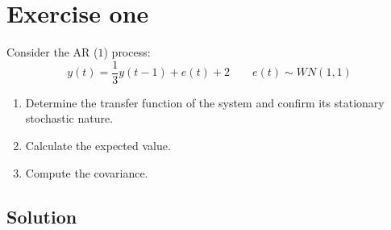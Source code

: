 \section{Exercise one}

Consider the AR ($1$) process:
\[y(t)=\dfrac{1}{3}y(t-1)+e(t)+2 \qquad e(t)\sim WN(1,1)\]
\begin{enumerate}
    \item Determine the transfer function of the system and confirm its stationary stochastic nature.
    \item Calculate the expected value.
    \item Compute the covariance.
\end{enumerate}

\subsection*{Solution}
